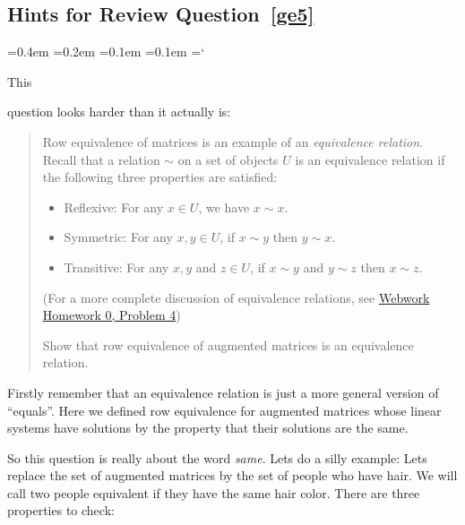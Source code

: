 
\subsection*{Hints for Review Question~\ref{ge5}}

{\ttfamily
{}\font=0.4em
\font=0.2em
\font=0.1em
\font=0.1em
\hyphenchar\font=`\-



\hypertarget{script_gaussian_elimination_hints}{This} question looks harder than it actually is:

\begin{quote}{\small
Row equivalence of matrices is an example of an \emph{equivalence relation}.  Recall that a relation $\sim$ on a set of objects $U$ is an equivalence relation if the following three properties are satisfied:
\begin{itemize}
\item Reflexive:  For any $x\in U$, we have $x\sim x$.
\item Symmetric:  For any $x,y \in U$, if $x\sim y$ then $y\sim x$.
\item Transitive: For any $x,y$ and $z \in U$, if $x\sim y$ and $y\sim z$ then $x\sim z$.
\end{itemize}

(For a more complete discussion of equivalence relations, see \href{\webworkurl Homework0-Background/4/}{Webwork Homework 0, Problem 4})

Show that row equivalence of augmented matrices is an equivalence relation.
}
\end{quote}

Firstly remember that an equivalence relation is just a more general version of ``equals''.
Here we defined row equivalence  for augmented matrices whose linear systems have
solutions by the property that their solutions are the same.

So this question is really about the word {\it same}. Lets do a silly example:
Lets replace the set of augmented matrices by the set of people who have hair.
We will call two people equivalent if they have the same hair color. There are three properties
to check:

}
